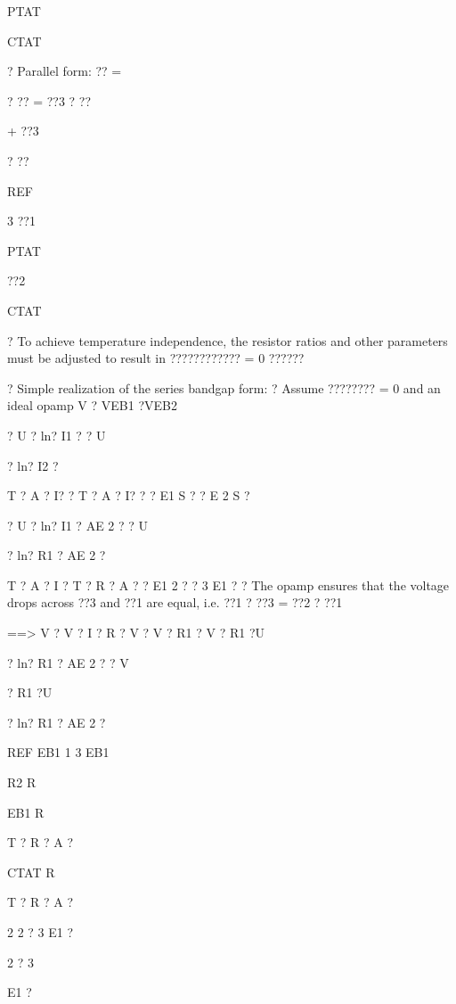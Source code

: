 \documentclass[2pt,landscape]{article}
\begin{document}
\begin{multicols*}{5}
PTAT


CTAT





?	Parallel form: ??	=


? ??	= ??3 ? ??



+ ??3



? ??


REF


3	??1


PTAT


??2


CTAT


?	To achieve temperature independence, the resistor ratios and other
parameters must be adjusted to result in ???????????? = 0
??????



?	Simple realization of the series bandgap form:
?	Assume ????????  = 0 and an ideal opamp
V	? VEB1 ?VEB2


? U ? ln?	I1	? ? U




? ln?	I2	?



T	? A	? I? ?	T	? A	? I? ?
?	E1	S ?	?	E 2	S ?


? U ? ln? I1 ? AE 2 ? ? U




? ln? R1 ? AE 2 ?



T	? A	? I ?	T	? R ? A	?
?	E1	2 ?	?	3	E1 ?
?	The opamp ensures that the voltage 
drops across ??3 and ??1 are equal,
i.e. ??1 ? ??3 = ??2 ? ??1


==> V	? V	? I ? R ? V	? V	? R1 ? V	? R1 ?U




? ln? R1 ? AE 2 ? ? V




?	R1 ?U




? ln? R1 ? AE 2 ?



REF	EB1	1	3	EB1


R2	R


EB1	R


T	? R ? A	?


CTAT	R


T	? R ? A	?


2	2	?	3	E1 ?


2	?	3


E1 ?



\end{multicols*}
\end{document}

